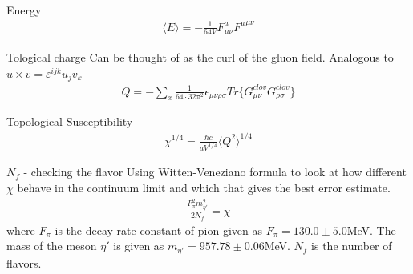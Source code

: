 \documentclass[10pt]{beamer}
\begin{document}
\begin{frame}{Energy}
	\begin{align}
		\langle E\rangle = -\frac{1}{64V}F_{\mu\nu}^a{F^a}^{\mu\nu}
	\end{align}
\end{frame}

\begin{frame}{Tological charge}
	Can be thought of as the curl of the gluon field. Analogous to $u \times v = \varepsilon^{ijk} u_j v_k$
	\begin{align}
		Q = - \sum_x \frac{1}{64 \cdot 32\pi^2}\epsilon_{\mu\nu\rho\sigma}Tr\{G^{clov}_{\mu\nu}G^{clov}_{\rho\sigma}\}
	\end{align}
\end{frame}

\begin{frame}{Topological Susceptibility}
	\begin{align}
		\chi^{1/4} = \frac{\hbar c}{aV^{1/4}}\langle Q^2 \rangle^{1/4}
	\end{align}
\end{frame}

\begin{frame}{$N_f$ - checking the flavor}
	Using Witten-Veneziano formula to look at how different $\chi$ behave in the continuum limit and which that gives the best error estimate.
	\begin{align*}
		\frac{F_\pi^2 m_{\eta'}^2}{2 N_f} = \chi
	\end{align*}
	where $F_\pi$ is the decay rate constant of pion given as $F_\pi=130.0\pm5.0$MeV. The mass of the meson $\eta'$ is given as $m_{\eta'}=957.78\pm0.06$MeV. $N_f$ is the number of flavors.
\end{frame}


\end{document}
